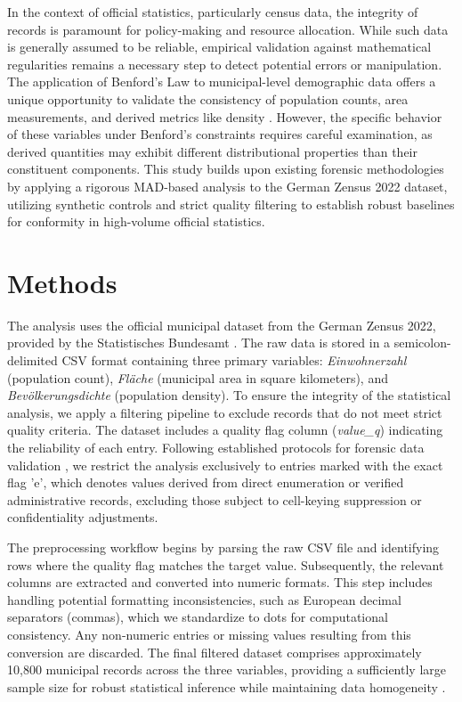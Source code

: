\documentclass[11pt,a4paper]{article}
\begin{document}
In the context of official statistics, particularly census data, the integrity of records is paramount for policy-making and resource allocation. While such data is generally assumed to be reliable, empirical validation against mathematical regularities remains a necessary step to detect potential errors or manipulation. The application of Benford's Law to municipal-level demographic data offers a unique opportunity to validate the consistency of population counts, area measurements, and derived metrics like density \cite{Morales2022BenfordsLF}. However, the specific behavior of these variables under Benford's constraints requires careful examination, as derived quantities may exhibit different distributional properties than their constituent components. This study builds upon existing forensic methodologies by applying a rigorous MAD-based analysis to the German Zensus 2022 dataset, utilizing synthetic controls and strict quality filtering to establish robust baselines for conformity in high-volume official statistics.

\section{Methods}
The analysis uses the official municipal dataset from the German Zensus 2022, provided by the Statistisches Bundesamt \cite{Ivanova2025BenfordsLA}. The raw data is stored in a semicolon-delimited CSV format containing three primary variables: \textit{Einwohnerzahl} (population count), \textit{Fläche} (municipal area in square kilometers), and \textit{Bevölkerungsdichte} (population density). To ensure the integrity of the statistical analysis, we apply a filtering pipeline to exclude records that do not meet strict quality criteria. The dataset includes a quality flag column (\textit{value\_q}) indicating the reliability of each entry. Following established protocols for forensic data validation \cite{Shalini2023DataQA}, we restrict the analysis exclusively to entries marked with the exact flag 'e', which denotes values derived from direct enumeration or verified administrative records, excluding those subject to cell-keying suppression or confidentiality adjustments.

The preprocessing workflow begins by parsing the raw CSV file and identifying rows where the quality flag matches the target value. Subsequently, the relevant columns are extracted and converted into numeric formats. This step includes handling potential formatting inconsistencies, such as European decimal separators (commas), which we standardize to dots for computational consistency. Any non-numeric entries or missing values resulting from this conversion are discarded. The final filtered dataset comprises approximately 10,800 municipal records across the three variables, providing a sufficiently large sample size for robust statistical inference while maintaining data homogeneity \cite{Miller2015BenfordsLT}.
\end{document}
